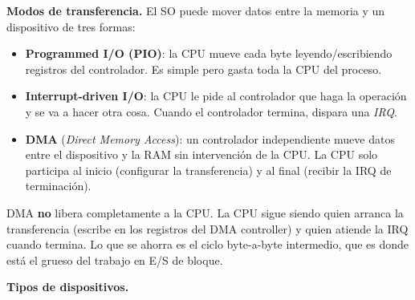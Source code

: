 \documentclass[11pt,a4paper]{article}
\begin{document}
\begin{center}
\end{center}

\textbf{Modos de transferencia.} El SO puede mover datos entre la
memoria y un dispositivo de tres formas:

\begin{itemize}[leftmargin=*,nosep]
    \item \textbf{Programmed I/O (PIO)}: la CPU mueve cada byte
        leyendo/escribiendo registros del controlador. Es simple pero
        gasta toda la CPU del proceso.
    \item \textbf{Interrupt-driven I/O}: la CPU le pide al controlador
        que haga la operación y se va a hacer otra cosa. Cuando el
        controlador termina, dispara una \emph{IRQ}.
    \item \textbf{DMA} (\emph{Direct Memory Access}): un controlador
        independiente mueve datos entre el dispositivo y la RAM sin
        intervención de la CPU. La CPU solo participa al inicio
        (configurar la transferencia) y al final (recibir la IRQ de
        terminación).
\end{itemize}

\begin{importante}
DMA \textbf{no} libera completamente a la CPU. La CPU sigue siendo
quien arranca la transferencia (escribe en los registros del DMA
controller) y quien atiende la IRQ cuando termina. Lo que se ahorra es
el ciclo byte-a-byte intermedio, que es donde está el grueso del
trabajo en E/S de bloque.
\end{importante}

\textbf{Tipos de dispositivos.}
\end{document}
